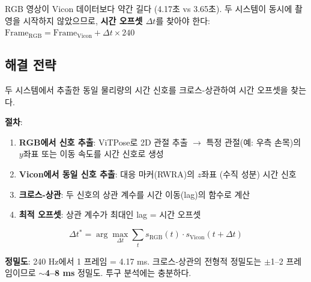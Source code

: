 \documentclass[11pt, a4paper]{report}
\begin{document}
RGB 영상이 Vicon 데이터보다 약간 길다 (4.17초 vs 3.65초).
두 시스템이 동시에 촬영을 시작하지 않았으므로,
\textbf{시간 오프셋 $\Delta t$}를 찾아야 한다:
$\text{Frame}_{\text{RGB}} = \text{Frame}_{\text{Vicon}} + \Delta t \times 240$

\subsection{해결 전략}

\begin{solutionbox}[title={Strategy 1: 동작 기반 크로스-상관 동기화 (권장)}]
두 시스템에서 추출한 동일 물리량의 시간 신호를 크로스-상관하여 시간 오프셋을 찾는다.

\textbf{절차}:
\begin{enumerate}[nosep]
  \item \textbf{RGB에서 신호 추출}: ViTPose로 2D 관절 추출 $\rightarrow$ 특정 관절(예: 우측 손목)의
        $y$좌표 또는 이동 속도를 시간 신호로 생성
  \item \textbf{Vicon에서 동일 신호 추출}: 대응 마커(RWRA)의 $z$좌표 (수직 성분) 시간 신호
  \item \textbf{크로스-상관}: 두 신호의 상관 계수를 시간 이동(lag)의 함수로 계산
  \item \textbf{최적 오프셋}: 상관 계수가 최대인 lag = 시간 오프셋
\end{enumerate}

\begin{equation}
  \Delta t^* = \arg\max_{\Delta t} \sum_t s_{\text{RGB}}(t) \cdot s_{\text{Vicon}}(t + \Delta t)
\end{equation}

\textbf{정밀도}: 240 Hz에서 1 프레임 = 4.17 ms.
크로스-상관의 전형적 정밀도는 $\pm$1--2 프레임이므로 $\sim$\textbf{4--8 ms} 정밀도.
투구 분석에는 충분하다.
\end{solutionbox}
\end{document}
